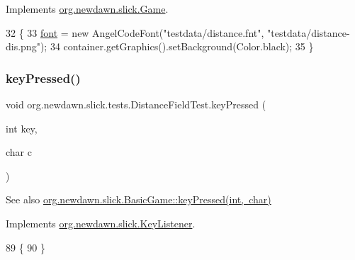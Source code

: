 Implements \mbox{\hyperlink{interfaceorg_1_1newdawn_1_1slick_1_1_game_ad2dd6affab08bb8fdb5fab0815957b7a}{org.\+newdawn.\+slick.\+Game}}.


\begin{DoxyCode}
32                                                                     \{
33         \mbox{\hyperlink{classorg_1_1newdawn_1_1slick_1_1tests_1_1_distance_field_test_aa6d827cd10230d8840d998c885d6103d}{font}} = \textcolor{keyword}{new} AngelCodeFont(\textcolor{stringliteral}{"testdata/distance.fnt"}, \textcolor{stringliteral}{"testdata/distance-dis.png"});
34         container.getGraphics().setBackground(Color.black);
35     \}
\end{DoxyCode}
\mbox{\label{classorg_1_1newdawn_1_1slick_1_1tests_1_1_distance_field_test_ada9839e97d2d42dca5e14cc437c38348}} 
\subsubsection{\texorpdfstring{key\+Pressed()}{keyPressed()}}
{\footnotesize\ttfamily void org.\+newdawn.\+slick.\+tests.\+Distance\+Field\+Test.\+key\+Pressed (\begin{DoxyParamCaption}\item[{int}]{key,  }\item[{char}]{c }\end{DoxyParamCaption})\hspace{0.3cm}{\ttfamily [inline]}}

\begin{DoxySeeAlso}{See also}
\mbox{\hyperlink{classorg_1_1newdawn_1_1slick_1_1_basic_game_a4fbb3345b5abf5ddd54a99466d07f02f}{org.\+newdawn.\+slick.\+Basic\+Game\+::key\+Pressed(int, char)}} 
\end{DoxySeeAlso}


Implements \mbox{\hyperlink{interfaceorg_1_1newdawn_1_1slick_1_1_key_listener_ac0b0568a21ef486c4f51382614c196ef}{org.\+newdawn.\+slick.\+Key\+Listener}}.


\begin{DoxyCode}
89                                             \{
90     \}
\end{DoxyCode}
\mbox{\label{classorg_1_1newdawn_1_1slick_1_1tests_1_1_distance_field_test_a1c70914f86f239dfe014c5fa0a5620aa}} 
